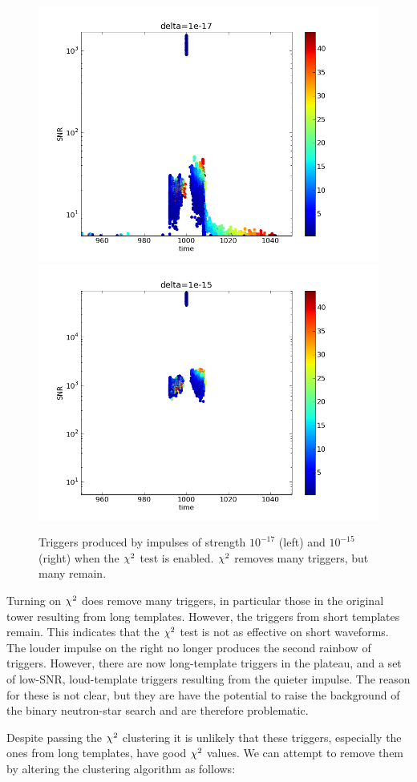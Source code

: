 \begin{figure}
  \includegraphics[width=0.5\linewidth]{figures/detchar/delta_chisq_1e-17}
  \includegraphics[width=0.5\linewidth]{figures/detchar/delta_chisq_1e-15}
  \caption[Triggers produced by loud impulses with $\chisq$ enabled] {
  \label{f:impulses_original_chisq}
Triggers produced by impulses of strength $10^{-17}$ (left) and
$10^{-15}$ (right) when the $\chisq$ test is enabled.  $\chisq$
removes many triggers, but many remain.
}
\end{figure}%

Turning on $\chisq$ does remove many triggers, in particular those in
the original tower resulting from long templates.  However, the
triggers from short templates remain.  This indicates that the
$\chisq$ test is not as effective on short waveforms.  The louder
impulse on the right no longer produces the second rainbow of
triggers.  However, there are now long-template triggers in the
plateau, and a set of low-SNR, loud-template triggers resulting from
the quieter impulse.  The reason for these is not clear, but they are
have the potential to raise the background of the binary neutron-star
search and are therefore problematic.

Despite passing the $\chisq$ clustering it is unlikely that these
triggers, especially the ones from long templates, have good $\chisq$
values.  We can attempt to remove them by altering the clustering
algorithm as follows:

\newpage

